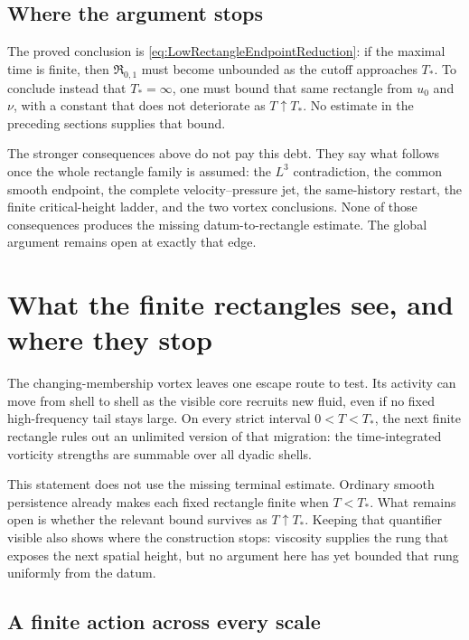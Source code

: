 \subsection{Where the argument stops}\label{sub:NoFiniteSingularTime}

The proved conclusion is \eqref{eq:LowRectangleEndpointReduction}: if the maximal time
is finite, then \(\mathfrak R_{0,1}\) must become unbounded as the cutoff approaches
\(T_*\).  To conclude instead that \(T_*=\infty\), one must bound that same rectangle
from \(u_0\) and \(\nu\), with a constant that does not deteriorate as
\(T\uparrow T_*\).  No estimate in the preceding sections supplies that bound.

The stronger consequences above do not pay this debt.  They say what follows once the
whole rectangle family is assumed: the \(L^3\) contradiction, the common smooth
endpoint, the complete velocity--pressure jet, the same-history restart, the finite
critical-height ladder, and the two vortex conclusions.  None of those consequences
produces the missing datum-to-rectangle estimate.  The global argument remains open at
exactly that edge.

\section{What the finite rectangles see, and where they stop}\label{sec:FurtherConsequencesAndEulerBoundary}

The changing-membership vortex leaves one escape route to test.  Its activity can move
from shell to shell as the visible core recruits new fluid, even if no fixed
high-frequency tail stays large.  On every strict interval \(0<T<T_*\), the next finite
rectangle rules out an unlimited version of that migration: the time-integrated
vorticity strengths are summable over all dyadic shells.

This statement does not use the missing terminal estimate.  Ordinary smooth persistence
already makes each fixed rectangle finite when \(T<T_*\).  What remains open is whether
the relevant bound survives as \(T\uparrow T_*\).  Keeping that quantifier visible also
shows where the construction stops: viscosity supplies the rung that exposes the next
spatial height, but no argument here has yet bounded that rung uniformly from the datum.

\subsection{A finite action across every scale}\label{sub:AFiniteSumAcrossScales}

